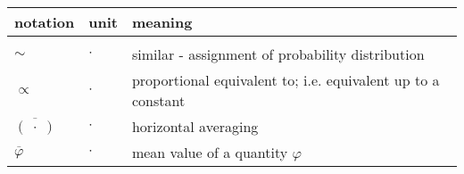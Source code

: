 \begin{onehalfspace}
\begin{tabular}{l l p{} }
\hline
		notation  & unit & meaning \\
\hline \\
		\( \sim \) & \( \cdot \) & similar - assignment of probability distribution\\	
		\( \propto \) & \( \cdot \) & proportional equivalent to; i.e.  equivalent up to a constant\\
		\( \overline{(\; \cdot \;)} \) & \( \cdot \) & horizontal averaging \\
		\( \overline{\varphi} \) & 	\( \cdot  \) & mean value of a quantity \( \varphi \)  \\
% 		
% 		
% 		
% 		

\end{tabular}
\end{onehalfspace}

